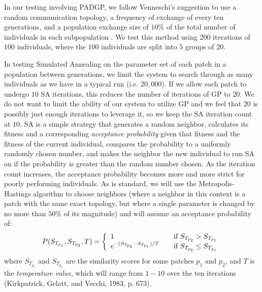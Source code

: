 \documentclass[a4paper,12pt]{report} 	%
\numberwithin{figure}{chapter}
\numberwithin{table}{chapter}
\numberwithin{equation}{chapter}
\begin{document}
\begin{flushleft}
In our testing involving PADGP, we follow Venneschi's suggestion to use a random communication topology, a frequency of exchange of every ten generations, and a population exchange size of $10\%$ of the total number of individuals in each subpopulation \cite[p. 190]{Vanneschi:2004le}. We test this method using $200$ iterations of $100$ individuals, where the $100$ individuals are split into $5$ groups of $20$.

In testing Simulated Annealing on the parameter set of each patch in a population between generations, we limit the system to search through as many individuals as we have in a typical run (i.e. $20,000$). If we allow each patch to undergo $10$ SA iterations, this reduces the number of iterations of GP to $20$. We do not want to limit the ability of our system to utilize GP and we feel that $20$ is possibly just enough iterations to leverage it, so we keep the SA iteration count at $10$. SA is a simple strategy that generates a random neighbor, calculates its fitness and a corresponding \emph{acceptance probability} given that fitness and the fitness of the current individual, compares the probability to a uniformly randomly chosen number, and makes the neighbor the new individual to run SA on if the probability is greater than the random number chosen. As the iteration count increases, the acceptance probability becomes more and more strict for poorly performing individuals. As is standard, we will use the Metropolis-Hastings algorithm to choose neighbors (where a neighbor in this context is a patch with the same exact topology, but where a single parameter is changed by no more than $50\%$ of its magnitude) and will assume an acceptance probability of:
\begin{equation}
P(S_{T_{p_1}}, S_{T_{p_2}}, T) = \left\{
   \begin{array}{l l}
    1 & \quad \text{if $S_{T_{p_2}}>S_{T_{p_1}}$}\\
    e^{-(S_{T_{p_2}} - S_{T_{p_1}})/T} & \quad \text{if $S_{T_{p_2}}\leq S_{T_{p_1}}$}
    \end{array} \right.
\end{equation}
where $S_{T_{p_1}}$ and $S_{T_{p_2}}$ are the similarity scores for some patches $p_1$ and $p_2$, and $T$ is the \emph{temperature value}, which will range from $1-10$ over the ten iterations (Kirkpatrick, Gelatt, and Vecchi, 1983, p. 673).


\end{flushleft}
\end{document}
